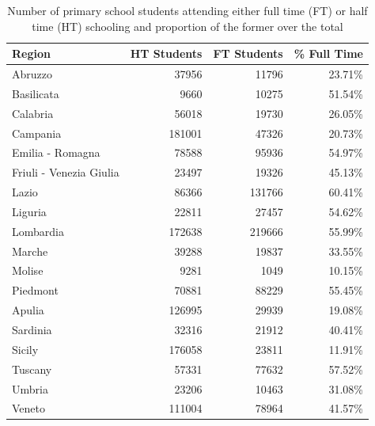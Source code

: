 \documentclass[openany, 11pt, oneside]{book}
\begin{document}
\begin{subappendices}
\begin{table}[ht]
\centering
\begin{tabular}{lrrr}
  \hline
  Region & HT Students & FT Students  & \% Full Time \\ 
  \hline
  Abruzzo & 37956 & 11796 & 23.71\% \\ 
  Basilicata & 9660 & 10275 & 51.54\% \\ 
  Calabria & 56018 & 19730 & 26.05\% \\ 
  Campania & 181001 & 47326 & 20.73\% \\ 
  Emilia - Romagna & 78588 & 95936 & 54.97\% \\ 
  Friuli - Venezia Giulia & 23497 & 19326 & 45.13\% \\ 
  Lazio & 86366 & 131766 & 60.41\% \\ 
  Liguria & 22811 & 27457 & 54.62\% \\ 
  Lombardia & 172638 & 219666 & 55.99\% \\ 
  Marche & 39288 & 19837 & 33.55\% \\ 
  Molise & 9281 & 1049 & 10.15\% \\ 
  Piedmont & 70881 & 88229 & 55.45\% \\ 
  Apulia & 126995 & 29939 & 19.08\% \\ 
  Sardinia & 32316 & 21912 & 40.41\% \\ 
  Sicily & 176058 & 23811 & 11.91\% \\ 
  Tuscany & 57331 & 77632 & 57.52\% \\ 
  Umbria & 23206 & 10463 & 31.08\% \\ 
  Veneto & 111004 & 78964 & 41.57\% \\ 
   \hline
\end{tabular}
  \captionsetup{width=0.9\textwidth}
\caption{Number of primary school students attending either full time (FT) or half time (HT) schooling and proportion of the former over the total}
\label{tab:fulltime}
\end{table}





\end{subappendices}
\end{document}
